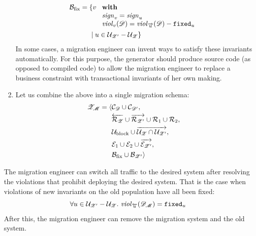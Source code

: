 \documentclass[runningheads]{llncs}
\newcommand{\id}[1]{\text{\it #1\/}}
\newcommand{\viol}[2]{\violC{#1}(#2)}
\newcommand{\violC}[1]{\id{viol}_{#1}}
\newcommand{\sign}[1]{\id{sign}_{#1}}
\newcommand{\concepts}{\mathcal{C}}
\newcommand{\rels}{\mathcal{R}}   %
\newcommand{\rules}{\mathcal{U}}
\newcommand{\transactions}{\mathcal{E}}
\newcommand{\busConstraints}{\mathcal{B}}
\newcommand{\dataset}{\mathscr{D}}
\newcommand{\schema}{\mathscr{Z}}
\newcommand{\migrsys}{\mathscr{M}}
\begin{document}
\begin{enumerate}
   \begin{align}
      \busConstraints_\text{fix}={}&\{v\ 
      \begin{array}[t]{l}
         \text{\bf with}\\
         \sign{v}=\sign{u}\\
         \viol{v}{\dataset}=\viol{\overrightarrow{u}}{\dataset}-{\tt fixed}_u
      \end{array}\\
      &\mid u\in\rules_{\schema'}-\rules_{\schema}\}\notag
   \end{align}
   In some cases, a migration engineer can invent ways to satisfy these invariants automatically.
   For this purpose, the generator should produce source code (as opposed to compiled code) to allow the migration engineer to replace a business constraint with transactional invariants of her own making.
\item Let us combine the above into a single migration schema:
   \begin{align}
      \schema_\migrsys=\langle{}&\concepts_\dataset\cup\concepts_{\dataset'},\label{eqn:schema migrsys}\\
      &\overleftarrow{\rels_{\schema}}\cup\overrightarrow{\rels_{\schema'}}\cup\rels_1\cup\rels_2,\notag\\
      &\rules_\text{block}\cup\overrightarrow{\rules_{\schema}\cap\rules_{\schema'}},\notag\\
      &\transactions_1\cup\transactions_2\cup\overrightarrow{\transactions_{\schema'}},\notag\\
      &\busConstraints_\text{fix}\cup\busConstraints_{\schema'}\rangle\notag
   \end{align}
\end{enumerate}
   The migration engineer can switch all traffic to the desired system
   after resolving the violations that prohibit deploying the desired system.
   That is the case when violations of new invariants on the old population have all been fixed:
\begin{equation}
   \forall u\in\rules_{\schema'}-\rules_{\schema}.\ \viol{\overleftarrow{u}}{\dataset_\migrsys}={\tt fixed}_u\label{eqn:readyForMoC}
\end{equation}
   After this, the migration engineer can remove the migration system and the old system.
\end{document}

